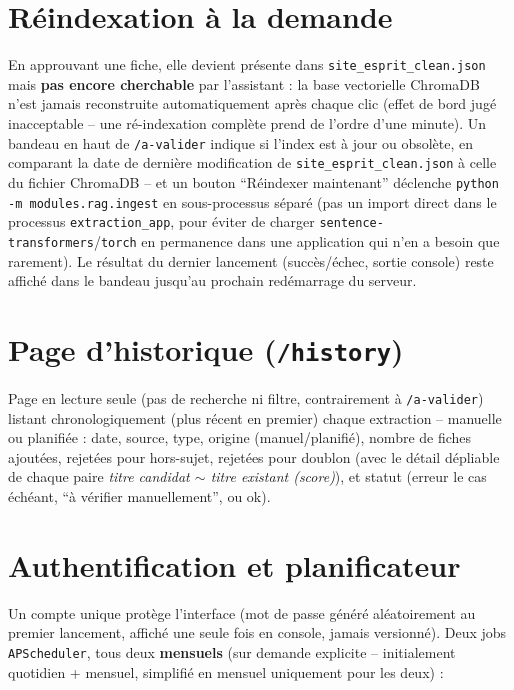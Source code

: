 \documentclass[11pt,a4paper]{report}
\begin{document}
\section{Réindexation à la demande}
En approuvant une fiche, elle devient présente dans \texttt{site\_esprit\_clean.json}
mais \textbf{pas encore cherchable} par l'assistant : la base vectorielle ChromaDB n'est
jamais reconstruite automatiquement après chaque clic (effet de bord jugé inacceptable --
une ré-indexation complète prend de l'ordre d'une minute). Un bandeau en haut de
\texttt{/a-valider} indique si l'index est à jour ou obsolète, en comparant la date de
dernière modification de \texttt{site\_esprit\_clean.json} à celle du fichier ChromaDB --
et un bouton ``Réindexer maintenant'' déclenche \texttt{python -m modules.rag.ingest} en
sous-processus séparé (pas un import direct dans le processus \texttt{extraction\_app},
pour éviter de charger \texttt{sentence-transformers}/\texttt{torch} en permanence dans
une application qui n'en a besoin que rarement). Le résultat du dernier lancement
(succès/échec, sortie console) reste affiché dans le bandeau jusqu'au prochain
redémarrage du serveur.

\section{Page d'historique (\texttt{/history})}
Page en lecture seule (pas de recherche ni filtre, contrairement à \texttt{/a-valider})
listant chronologiquement (plus récent en premier) chaque extraction -- manuelle ou
planifiée : date, source, type, origine (manuel/planifié), nombre de fiches ajoutées,
rejetées pour hors-sujet, rejetées pour doublon (avec le détail dépliable de chaque paire
\emph{titre candidat $\sim$ titre existant (score)}), et statut (erreur le cas échéant,
``à vérifier manuellement'', ou ok).

\section{Authentification et planificateur}

Un compte unique protège l'interface (mot de passe généré aléatoirement au premier
lancement, affiché une seule fois en console, jamais versionné). Deux jobs
\texttt{APScheduler}, tous deux \textbf{mensuels} (sur demande explicite -- initialement
quotidien + mensuel, simplifié en mensuel uniquement pour les deux) :
\end{document}
